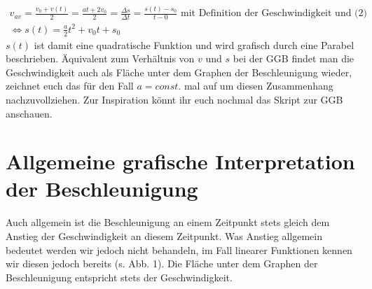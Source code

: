\documentclass[11pt]{article}
\begin{document}
\begin{gather}
    \nonumber v_{av} = \frac{v_0 + v(t)}{2} = \frac{at + 2v_0}{2} = \frac{\Delta s}{\Delta t} = \frac{s(t)-s_0}{t-0} \text{ mit Definition der Geschwindigkeit und (2)} \\
    \Longleftrightarrow s(t) = \frac{a}{2}t^2 + v_0t + s_0
\end{gather}
$s(t)$ ist damit eine quadratische Funktion und wird grafisch durch eine Parabel beschrieben. Äquivalent zum Verhältnis von $v$ und $s$ bei der GGB findet man die Geschwindigkeit auch als Fläche unter dem Graphen der Beschleunigung wieder, zeichnet euch das für den Fall $a=const.$ mal auf um diesen Zusammenhang nachzuvollziehen. Zur Inspiration könnt ihr euch nochmal das Skript zur GGB anschauen. 

\section{Allgemeine grafische Interpretation der Beschleunigung}
Auch allgemein ist die Beschleunigung an einem Zeitpunkt stets gleich dem Anstieg der Geschwindigkeit an diesem Zeitpunkt. Was Anstieg allgemein bedeutet werden wir jedoch nicht behandeln, im Fall linearer Funktionen kennen wir diesen jedoch bereits (s. Abb. 1). Die Fläche unter dem Graphen der Beschleunigung entspricht stets der Geschwindigkeit. 
\end{document}
